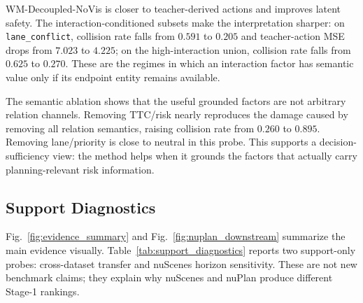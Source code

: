 \documentclass[journal]{IEEEtran}
\begin{document}
WM-Decoupled-NoVis is closer to teacher-derived actions and improves latent safety. The interaction-conditioned subsets make the interpretation sharper: on \texttt{lane\_conflict}, collision rate falls from $0.591$ to $0.205$ and teacher-action MSE drops from $7.023$ to $4.225$; on the high-interaction union, collision rate falls from $0.625$ to $0.270$. These are the regimes in which an interaction factor has semantic value only if its endpoint entity remains available.

\begin{table}[!t]
\caption{Interaction feature-group ablation on trained nuPlan 50k WM-Decoupled-NoVis checkpoints. This evaluation-time probe tests which factor dimensions drive the planning gain.}
\label{tab:main_relation_groups}
\centering
{}
\end{table}

The semantic ablation shows that the useful grounded factors are not arbitrary relation channels. Removing TTC/risk nearly reproduces the damage caused by removing all relation semantics, raising collision rate from $0.260$ to $0.895$. Removing lane/priority is close to neutral in this probe. This supports a decision-sufficiency view: the method helps when it grounds the factors that actually carry planning-relevant risk information.

\subsection{Support Diagnostics}
Fig.~\ref{fig:evidence_summary} and Fig.~\ref{fig:nuplan_downstream} summarize the main evidence visually. Table~\ref{tab:support_diagnostics} reports two support-only probes: cross-dataset transfer and nuScenes horizon sensitivity. These are not new benchmark claims; they explain why nuScenes and nuPlan produce different Stage-1 rankings.
\end{document}
